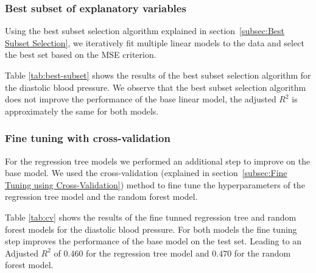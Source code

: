 \documentclass[12 pt]{scrartcl}
\numberwithin{equation}{section}
\begin{document}
\subsubsection*{Best subset of explanatory variables}
\label{subsubsec:Best subset of explanatory variables}

Using the best subset selection algorithm explained in section~\ref{subsec:Best Subset Selection}, we iteratively fit multiple
linear models to the data and select the best set based on the MSE criterion.

Table \ref{tab:best-subset} shows the results of the best subset selection algorithm for the diastolic blood pressure.
We observe that the best subset selection algorithm does not improve the performance of the base linear model, 
the adjusted $R^2$ is approximately the same for both models.

\begin{table}[H]
    \centering
    \caption{Results of the best subset selection algorithm for the diastolic blood pressure.}
    \label{tab:best-subset}
    \end{table}

\subsubsection*{Fine tuning with cross-validation}

For the regression tree models we performed an additional step to improve on the base model.
We used the cross-validation (explained in section~\ref{subsec:Fine Tuning using Cross-Validation}) method to fine tune the hyperparameters of the regression tree model
and the random forest model.

Table \ref{tab:cv} shows the results of the fine tunned regression tree and random forest models for the diastolic blood pressure.
For both models the fine tuning step improves the performance of the base model on the test set.
Leading to an Adjusted $R^2$ of $0.460$ for the regression tree model and $0.470$ for the random forest model.
\end{document}
